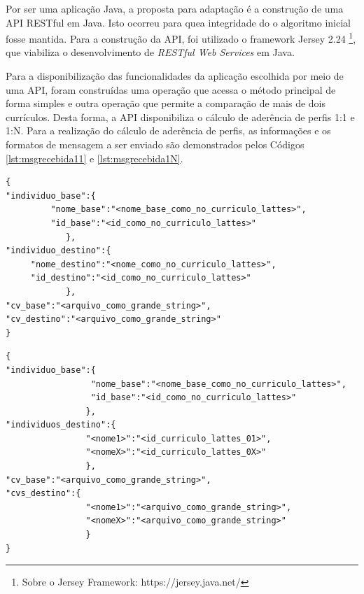 Por ser uma aplicação Java, a proposta para adaptação é a construção de uma API RESTful em Java. Isto ocorreu para quea integridade do o algoritmo inicial fosse mantida. Para a construção da API, foi utilizado o framework Jersey 2.24 \footnote{Sobre o Jersey Framework: https://jersey.java.net/}, que viabiliza o desenvolvimento de \textit{RESTful Web Services} em Java.

Para a disponibilização das funcionalidades da aplicação escolhida por meio de uma API, foram construídas uma operação que acessa o método principal de forma simples e outra operação que permite a comparação de mais de dois currículos. Desta forma, a API disponibiliza o cálculo de aderência de perfis 1:1 e 1:N. Para a realização do cálculo de aderência de perfis, as informações e os formatos de mensagem a ser enviado são demonstrados pelos Códigos \ref{lst:msgrecebida11} e \ref{lst:msgrecebida1N}.



\begin{lstlisting}[caption={Formato de mensagem recebido pela API (1:1).},label={lst:msgrecebida11}]
{
"individuo_base":{
         "nome_base":"<nome_base_como_no_curriculo_lattes>",
         "id_base":"<id_como_no_curriculo_lattes>"
            },
"individuo_destino":{
     "nome_destino":"<nome_como_no_curriculo_lattes>",
     "id_destino":"<id_como_no_curriculo_lattes>"
            },
"cv_base":"<arquivo_como_grande_string>",
"cv_destino":"<arquivo_como_grande_string>"
}
\end{lstlisting}



\begin{lstlisting}[caption={Formato de mensagem recebido pela API (1:N).},label={lst:msgrecebida1N}]
{
"individuo_base":{
	        	 "nome_base":"<nome_base_como_no_curriculo_lattes>",
    		     "id_base":"<id_como_no_curriculo_lattes>"
	            },
"individuos_destino":{
				"<nome1>":"<id_curriculo_lattes_01>",
				"<nomeX>":"<id_curriculo_lattes_0X>"
				},
"cv_base":"<arquivo_como_grande_string>",
"cvs_destino":{
				"<nome1>":"<arquivo_como_grande_string>",
				"<nomeX>":"<arquivo_como_grande_string>"
				}
}
\end{lstlisting}

